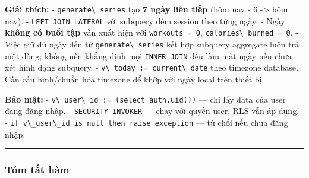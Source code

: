 \documentclass[12pt,a4paper]{article}
\providecommand{\passthrough}[1]{#1}
\begin{document}
\textbf{Giải thích:} - \passthrough{\lstinline!generate\_series!} tạo
\textbf{7 ngày liên tiếp} (hôm nay - 6 -\textgreater{} hôm nay). -
\passthrough{\lstinline!LEFT JOIN LATERAL!} với subquery đếm session
theo từng ngày. - Ngày \textbf{không có buổi tập} vẫn xuất hiện với
\passthrough{\lstinline!workouts = 0!},
\passthrough{\lstinline!calories\_burned = 0!}. - Việc giữ đủ ngày đến
từ \passthrough{\lstinline!generate\_series!} kết hợp subquery aggregate
luôn trả một dòng; không nên khẳng định mọi
\passthrough{\lstinline!INNER JOIN!} đều làm mất ngày nếu chưa xét hình
dạng subquery. - \passthrough{\lstinline!v\_today := current\_date!}
theo timezone database. Cần cấu hình/chuẩn hóa timezone để khớp với ngày
local trên thiết bị.

\textbf{Bảo mật:} -
\passthrough{\lstinline!v\_user\_id := (select auth.uid())!} --- chỉ lấy
data của user đang đăng nhập. -
\passthrough{\lstinline!SECURITY INVOKER!} --- chạy với quyền user, RLS
vẫn áp dụng. -
\passthrough{\lstinline!if v\_user\_id is null then raise exception!}
--- từ chối nếu chưa đăng nhập.

\begin{center}\rule{0.5\linewidth}{0.5pt}\end{center}

\subsubsection{Tóm tắt hàm}\label{tuxf3m-tux1eaft-huxe0m}
\end{document}
